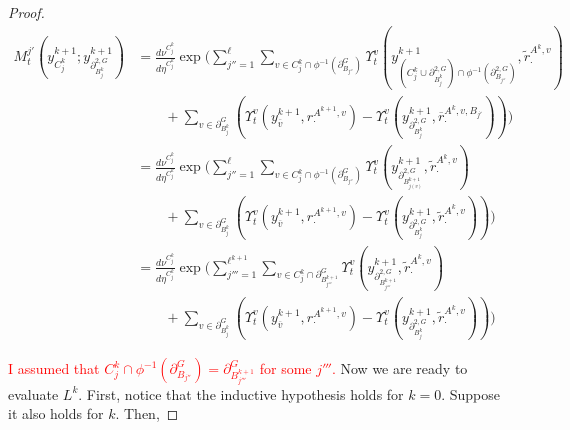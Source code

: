 \documentclass[12pt]{article}
\newcommand{\ov}{\overline}
\newcommand{\tr}{\textcolor{red}}
\newcommand{\gneigh}[2]{\partial^{#1}_{#2}}			%
\newcommand{\dgneigh}[2]{\partial^{2,#1}_{#2}}		%
\newcommand{\cl}[1]{\ov{#1}}						%
\newcommand{\indx}[1]{^{#1}}						%
\newcommand{\rate}{r}								%
\newcommand{\xg}{y}									%
\newcommand{\vind}[1]{_{#1}}						%
\newcommand{\vpara}[1]{^{#1}}						%
\newcommand{\stpara}[1]{_{#1}}						%
\newcommand{\tpara}[1]{_{#1}}						%
\newcommand{\gvpara}[2]{^{#1,#2}}					%
\newcommand{\psize}{\ell}							%
\newcommand{\brate}{\alt{\rate}}					%
\newcommand{\alt}[1]{\tilde{#1}}					%
\newcommand{\mm}{\nu}								%
\newcommand{\bgrate}{\ov{\rate}}					%
\newcommand{\mmm}{\eta}								%
\newcommand{\ds}{\Upsilon}							%
\newcommand{\dense}{L}								%
\newcommand{\mdense}{M}								%
\newcommand{\gvjpara}[3]{^{#1,#2,#3}}				%
\newcommand{\jpara}[1]{^{#1}}						%
\begin{document}
\begin{proof}
\begin{align*}
\mdense\jpara{j'}\tpara{t}\left(\xg\indx{k+1}\vind{C_j\indx{k}};\xg\indx{k+1}\vind{\dgneigh{G}{B\indx{k}_j}}\right)&=  \frac{d\mm\vpara{C_j\indx{k}}}{d\mmm\vpara{C_j\indx{k}}}\exp\Bigg(\sum_{j'' =1}^{\psize}\sum_{v \in C_j\indx{k}\cap\phi^{-1}(\gneigh{G}{B_{j''}})} \ds\vpara{v}\tpara{t}\left(\xg\indx{k+1}\vind{\left(C_j\indx{k}\cup\dgneigh{G}{B_j\indx{k}}\right)\cap\phi^{-1}(\dgneigh{G}{B_{j''}})},\brate\gvpara{A\indx{k}}{v}\stpara{\cdot}\right)\\
&\hspace{24pt} + \sum_{v \in \gneigh{G}{B_j\indx{k}}}\left(\ds\vpara{v}\tpara{t}\left(\xg\indx{k+1}\vind{\cl{v}},\rate\gvpara{A\indx{k+1}}{v}\stpara{\cdot}\right) - \ds\vpara{v}\tpara{t}\left(\xg\indx{k+1}\vind{\dgneigh{G}{B_j\indx{k}}},\bgrate\gvjpara{A\indx{k}}{v}{B_{j'}}\stpara{\cdot}\right)\right)\Bigg)\\
&=\frac{d\mm\vpara{C_j\indx{k}}}{d\mmm\vpara{C_j\indx{k}}}\exp\Bigg(\sum_{j'' =1}^{\psize}\sum_{v \in C_j\indx{k}\cap\phi^{-1}(\gneigh{G}{B_{j''}})}\ds\vpara{v}\tpara{t}\left(\xg\indx{k+1}\vind{\dgneigh{G}{B_{j(v)}\indx{k+1}}},\brate\gvpara{A\indx{k}}{v}\stpara{\cdot}\right)\\
&\hspace{24pt} + \sum_{v \in \gneigh{G}{B_j\indx{k}}}\left(\ds\vpara{v}\tpara{t}\left(\xg\indx{k+1}\vind{\cl{v}},\rate\gvpara{A\indx{k+1}}{v}\stpara{\cdot}\right) - \ds\vpara{v}\tpara{t}\left(\xg\indx{k+1}\vind{\dgneigh{G}{B_j\indx{k}}},\brate\gvpara{A\indx{k}}{v}\stpara{\cdot}\right)\right)\Bigg)\\
&=\frac{d\mm\vpara{C_j\indx{k}}}{d\mmm\vpara{C_j\indx{k}}}\exp\Bigg(\sum_{j'''=1}^{\psize\indx{k+1}}\sum_{v \in C_j\indx{k}\cap\gneigh{G}{B_{j'''}\indx{k+1}}}\ds\vpara{v}\tpara{t}\left(\xg\indx{k+1}\vind{\dgneigh{G}{B_{j'''}\indx{k+1}}},\brate\gvpara{A\indx{k}}{v}\stpara{\cdot}\right)\\
&\hspace{24pt} + \sum_{v \in \gneigh{G}{B_j\indx{k}}}\left(\ds\vpara{v}\tpara{t}\left(\xg\indx{k+1}\vind{\cl{v}},\rate\gvpara{A\indx{k+1}}{v}\stpara{\cdot}\right) - \ds\vpara{v}\tpara{t}\left(\xg\indx{k+1}\vind{\dgneigh{G}{B_j\indx{k}}},\brate\gvpara{A\indx{k}}{v}\stpara{\cdot}\right)\right)\Bigg)
\end{align*}

\tr{I assumed that \(C_j\indx{k}\cap\phi^{-1}(\gneigh{G}{B_{j''}}) = \gneigh{G}{B_{j'''}\indx{k+1}}\) for some \(j'''\). }Now we are ready to evaluate \(\dense\indx{k}\). First, notice that the inductive hypothesis holds for \(k=0\). Suppose it also holds for \(k\). Then,


\end{proof}
\end{document}
